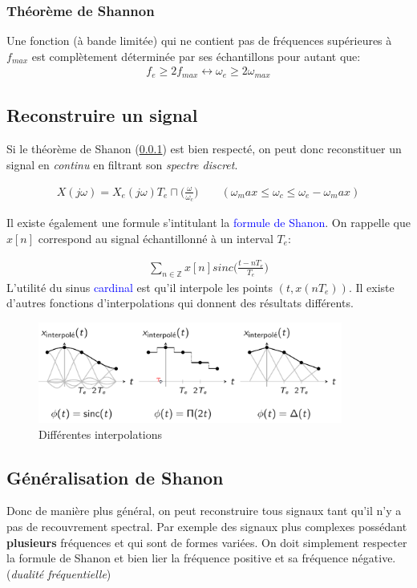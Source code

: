 \documentclass{report}
\begin{document}
\subsubsection{Théorème de Shannon} \label{Sha}
Une fonction (à bande limitée) qui ne contient pas de fréquences supérieures à $f_{max}$ est complètement déterminée par ses échantillons pour autant que:
\begin{align*}
f_e \geq 2 f_{max} \longleftrightarrow \omega_e \geq 2 \omega_{max}
\end{align*}	

\subsection{Reconstruire un signal}
Si le théorème de Shanon (\ref{Sha}) est bien respecté, on peut donc reconstituer un signal en \textit{continu} en filtrant son \textit{spectre discret}.

\begin{align*}
X(j\omega) = X_e(j\omega) T_e \sqcap \Bigr( \frac{\omega}{\omega_c} \Bigr) \qquad (\omega_max \leq \omega_c \leq \omega_e - \omega_max)
\end{align*}

Il existe également une formule s'intitulant la \textcolor{blue}{formule de Shanon}. On rappelle que $x[n]$ correspond au signal échantillonné à un interval $T_e$:

\begin{align*}
\sum_{n \in \mathbb{Z}} x[n] sinc\Bigr( \frac{t-nT_e}{T_e} \Bigr)
\end{align*}
L'utilité du sinus \textcolor{blue}{cardinal} est qu'il interpole les points $(t, x(nT_e))$. Il existe d'autres fonctions d'interpolations qui donnent des résultats différents.
\begin{figure}[H]
\centering
\includegraphics[width=10cm]{img/int.png}
\caption{Différentes interpolations}
\end{figure}

\subsection{Généralisation de Shanon}
Donc de manière plus général, on peut reconstruire tous signaux tant qu'il n'y a pas de recouvrement spectral. Par exemple des signaux plus complexes possédant \textbf{plusieurs} fréquences et qui sont de formes variées. On doit simplement respecter la formule de Shanon et bien lier la fréquence positive et sa fréquence négative. (\textit{dualité fréquentielle})
\end{document}
